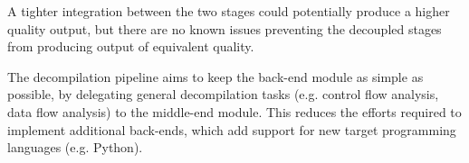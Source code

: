 A tighter integration between the two stages could potentially produce a higher quality output, but there are no known issues preventing the decoupled stages from producing output of equivalent quality.

The decompilation pipeline aims to keep the back-end module as simple as possible, by delegating general decompilation tasks (e.g. control flow analysis, data flow analysis) to the middle-end module. This reduces the efforts required to implement additional back-ends, which add support for new target programming languages (e.g. Python).




